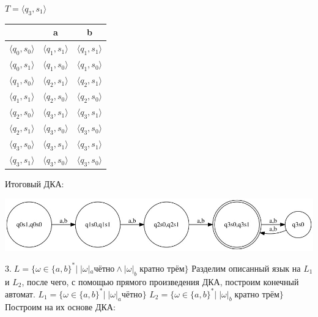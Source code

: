 \documentclass[a4paper,12pt]{article}
\begin{document}
$T = \langle q_3 , s_1 \rangle$\newline
\begin{center}
\begin{tabular}{ |c|c|c| } 
\hline
  & a & b \\ [0.5ex] 
 \hline
 $\langle q_0 , s_0 \rangle$ & $\langle q_1 , s_1 \rangle$ & $\langle q_1 , s_1 \rangle$ \\ 
 $\langle q_0 , s_1 \rangle $ & $\langle q_1 , s_0 \rangle$ & $\langle q_1 , s_0 \rangle$ \\ 
 $\langle q_1 , s_0 \rangle $ & $\langle q_2 , s_1 \rangle$ & $\langle q_2 , s_1 \rangle$ \\ 
 $\langle q_1 , s_1 \rangle $ & $\langle q_2 , s_0 \rangle$ & $\langle q_2 , s_0 \rangle$ \\ 
 $\langle q_2 , s_0 \rangle $ & $\langle q_3 , s_1 \rangle$ & $\langle q_3 , s_1 \rangle$ \\
 $\langle q_2 , s_1 \rangle $ & $\langle q_3 , s_0 \rangle$ & $\langle q_3 , s_0 \rangle$ \\
 $\langle q_3 , s_0 \rangle $ & $\langle q_3 , s_1 \rangle$ & $\langle q_3 , s_1 \rangle$ \\
 $\langle q_3 , s_1 \rangle $ & $\langle q_3 , s_0 \rangle$ & $\langle q_3 , s_0 \rangle$ \\
 \hline
\end{tabular}
\end{center}
Итоговый ДКА:
\begin{center}
\includegraphics[width=1.15\textwidth]{2_2}\newline
\end{center}
\Large $3.\;L = {\{\omega \in \{a,b\}^*|\;|\omega|_a \text{чётно}\land|\omega|_b \; \text{кратно трём}\}}$\newline
Разделим описанный язык на $L_1$ и $L_2$, после чего, с помощью прямого произведения ДКА, построим конечный автомат.\newline
\Large $L_1 = {\{\omega \in \{a,b\}^*|\;|\omega|_a \text{чётно}\}}$\newline
\Large $L_2 = {\{\omega \in \{a,b\}^*|\;|\omega|_b \; \text{кратно трём}\}}$\newline
Построим на их основе ДКА:\newline
\end{document}
